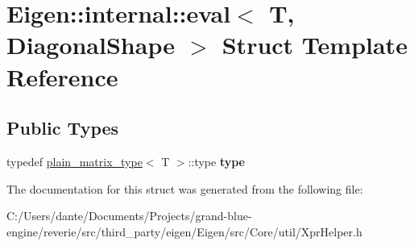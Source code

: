 \hypertarget{struct_eigen_1_1internal_1_1eval_3_01_t_00_01_diagonal_shape_01_4}{}\section{Eigen\+::internal\+::eval$<$ T, Diagonal\+Shape $>$ Struct Template Reference}
\label{struct_eigen_1_1internal_1_1eval_3_01_t_00_01_diagonal_shape_01_4}
\subsection*{Public Types}
\begin{DoxyCompactItemize}
\item 
\mbox{\label{struct_eigen_1_1internal_1_1eval_3_01_t_00_01_diagonal_shape_01_4_a41a0f100ce6d787321b16082a103423b}} 
typedef \mbox{\hyperlink{struct_eigen_1_1internal_1_1plain__matrix__type}{plain\+\_\+matrix\+\_\+type}}$<$ T $>$\+::type {\bfseries type}
\end{DoxyCompactItemize}


The documentation for this struct was generated from the following file\+:\begin{DoxyCompactItemize}
\item 
C\+:/\+Users/dante/\+Documents/\+Projects/grand-\/blue-\/engine/reverie/src/third\+\_\+party/eigen/\+Eigen/src/\+Core/util/Xpr\+Helper.\+h\end{DoxyCompactItemize}
